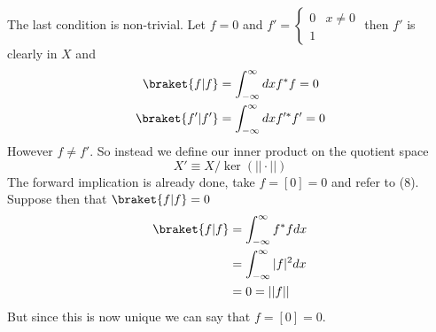 The last condition is non-trivial. Let $f=0$ and $f'=\begin{cases}
    0 & x\neq0\\
    1
\end{cases}$ then $f'$ is clearly in $X$ and
\begin{equation}
    \begin{split}
        \braket{f|f} &= \int_{-\infty}^\infty dxf^\ast f = 0\\
        \braket{f'|f'}&= \int_{-\infty}^\infty dxf'^\ast f' = 0\\
    \end{split}
\end{equation}
However $f\neq f'$. So instead we define our inner product on the quotient space
$$X'\equiv X/\ker(||\cdot||)$$
The forward implication is already done, take $f=[0] = 0$ and refer to (8). Suppose then that $\braket{f|f}=0$
\begin{equation}
    \begin{split}
        \braket{f|f}
        &= \int_{-\infty}^\infty f^\ast f dx\\
        &= \int_{-\infty}^\infty |f|^2 dx\\
        &= 0 = ||f||
    \end{split}
\end{equation}
But since this is now unique we can say that $f = [0] = 0$.

